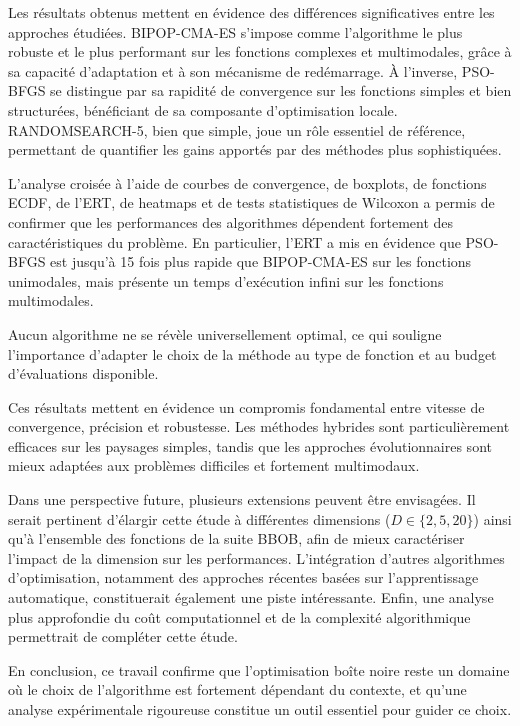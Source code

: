 \documentclass[conference]{IEEEtran}
\begin{document}
Les r\'esultats obtenus mettent en \'evidence des diff\'erences significatives entre les approches \'etudi\'ees. BIPOP-CMA-ES s'impose comme l'algorithme le plus robuste et le plus performant sur les fonctions complexes et multimodales, gr\^ace \`a sa capacit\'e d'adaptation et \`a son m\'ecanisme de red\'emarrage. \`A l'inverse, PSO-BFGS se distingue par sa rapidit\'e de convergence sur les fonctions simples et bien structur\'ees, b\'en\'eficiant de sa composante d'optimisation locale. RANDOMSEARCH-5, bien que simple, joue un r\^ole essentiel de r\'ef\'erence, permettant de quantifier les gains apport\'es par des m\'ethodes plus sophistiqu\'ees.

L'analyse crois\'ee \`a l'aide de courbes de convergence, de boxplots, de fonctions ECDF, de l'ERT, de heatmaps et de tests statistiques de Wilcoxon a permis de confirmer que les performances des algorithmes d\'ependent fortement des caract\'eristiques du probl\`eme. En particulier, l'ERT a mis en \'evidence que PSO-BFGS est jusqu'\`a 15 fois plus rapide que BIPOP-CMA-ES sur les fonctions unimodales, mais pr\'esente un temps d'ex\'ecution infini sur les fonctions multimodales.

Aucun algorithme ne se r\'ev\`ele universellement optimal, ce qui souligne l'importance d'adapter le choix de la m\'ethode au type de fonction et au budget d'\'evaluations disponible.

Ces r\'esultats mettent en \'evidence un compromis fondamental entre vitesse de convergence, pr\'ecision et robustesse. Les m\'ethodes hybrides sont particuli\`erement efficaces sur les paysages simples, tandis que les approches \'evolutionnaires sont mieux adapt\'ees aux probl\`emes difficiles et fortement multimodaux.

Dans une perspective future, plusieurs extensions peuvent \^etre envisag\'ees. Il serait pertinent d'\'elargir cette \'etude \`a diff\'erentes dimensions ($D \in \{2, 5, 20\}$) ainsi qu'\`a l'ensemble des fonctions de la suite BBOB, afin de mieux caract\'eriser l'impact de la dimension sur les performances. L'int\'egration d'autres algorithmes d'optimisation, notamment des approches r\'ecentes bas\'ees sur l'apprentissage automatique, constituerait \'egalement une piste int\'eressante. Enfin, une analyse plus approfondie du co\^ut computationnel et de la complexit\'e algorithmique permettrait de compl\'eter cette \'etude.

En conclusion, ce travail confirme que l'optimisation bo\^ite noire reste un domaine o\`u le choix de l'algorithme est fortement d\'ependant du contexte, et qu'une analyse exp\'erimentale rigoureuse constitue un outil essentiel pour guider ce choix.
\end{document}
